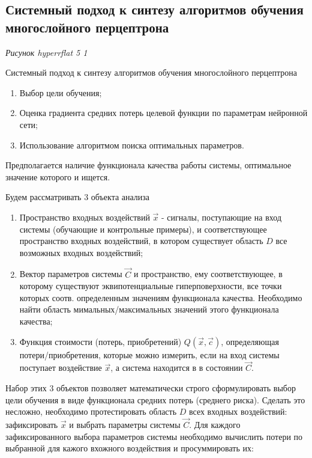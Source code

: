 \documentclass{article}
\begin{document}
\subsection{Системный подход к синтезу алгоритмов обучения многослойного перцептрона}


\begin{myquote}
    \textit{Рисунок hyperrflat 5 1}
\end{myquote}

Системный подход к синтезу алгоритмов обучения многослойного перцептрона
\begin{enumerate}
    \item Выбор цели обучения;
    \item Оценка градиента средних потерь целевой функции по параметрам нейронной сети;
    \item Использование алгоритмом поиска оптимальных параметров.
\end{enumerate}

Предполагается наличие функционала качества работы системы, оптимальное значение которого и ищется.

Будем рассматривать 3 объекта анализа
\begin{enumerate}
    \item Пространство входных воздействий $\vec{x}$ - сигналы, поступающие на вход системы (обучающие и контрольные примеры), и соответствующее пространство входных воздействий, в котором существует область $D$ все возможных входных воздействий;
    \item Вектор параметров системы $\vec{C}$ и пространство, ему соответствующее, в которому существуют эквипотенциальные гиперповерхности, все точки которых соотв. определенным значениям функционала качества. Необходимо найти область мимальных/максимальных значений этого функционала качества;
    \item Функция стоимости (потерь, приобретений) $Q(\vec{x}, \vec{c})$, определяющая потери/приобретения, которые можно измерить, если на вход системы поступает воздействие $\vec{x}$, а система находится в в состоянии $\vec{C}$.
\end{enumerate}

Набор этих 3 объектов позволяет математически строго сформулировать выбор цели обучения в виде функционала средних потерь (среднего риска).
Сделать это несложно, необходимо протестировать область $D$ всех входных воздействий: зафиксировать $\vec{x}$ и выбрать параметры системы $\vec{C}$. 
Для каждого зафиксированного выбора параметров системы необходимо вычислить потери по выбранной для кажого вхожного воздействия и просуммировать их:
\end{document}
